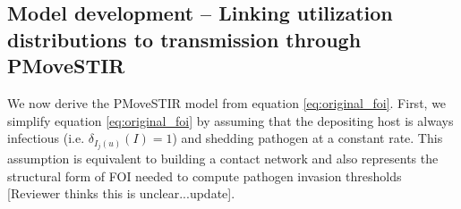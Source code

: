 \documentclass[letterpaper]{article}
\begin{document}





\subsection*{Model development -- Linking utilization distributions to transmission through PMoveSTIR}

We now derive the PMoveSTIR model from equation \ref{eq:original_foi}. First, we simplify equation \ref{eq:original_foi} by assuming that the depositing host is always infectious (i.e. $\delta_{I_j(u)}(I)=1$) and shedding pathogen at a constant rate. This assumption is equivalent to building a contact network and also represents the structural form of FOI needed to compute pathogen invasion thresholds \citep{Wilber2022} [Reviewer thinks this is unclear...update].  
\end{document}
